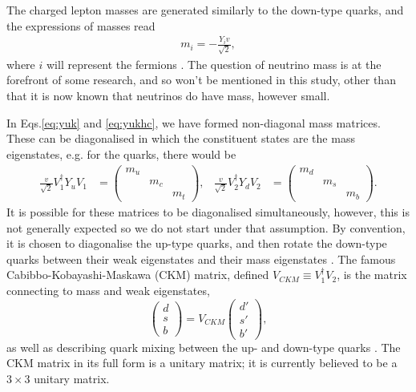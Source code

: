 \documentclass[a4paper,12pt]{article}
\begin{document}
The charged lepton masses are generated similarly to the down-type quarks, and the expressions of masses read
\begin{align}
    \label{eq:fermas}
    m_i = -\frac{Y_iv}{\sqrt{2}},
\end{align}
where $i$ will represent the fermions \cite{schwartz}. 
The question of neutrino mass is at the forefront of some research, and so won't be mentioned in this study, other than that it is now known that neutrinos do have mass, however small. 

In Eqs.\eqref{eq:yuk} and \eqref{eq:yukhc}, we have formed non-diagonal mass matrices. 
These can be diagonalised in which the constituent states are the mass eigenstates, e.g. for the quarks, there would be 
\begin{align}
    \label{eq:massmat}
    \frac{v}{\sqrt{2}}V_1^\dagger Y_uV_1 &= \begin{pmatrix} m_u & & \\ & m_c & \\ & & m_t\end{pmatrix}, & \frac{v}{\sqrt{2}}V_2^\dagger Y_dV_2 &= \begin{pmatrix} m_d & & \\ & m_s & \\ & & m_b\end{pmatrix}.
\end{align}
It is possible for these matrices to be diagonalised simultaneously, however, this is not generally expected so we do not start under that assumption. 
By convention, it is chosen to diagonalise the up-type quarks, and then rotate the down-type quarks between their weak eigenstates and their mass eigenstates \cite{dono}. 
The famous Cabibbo-Kobayashi-Maskawa (CKM) matrix, defined $V_{CKM}\equiv V_1^\dagger V_2$, is the matrix connecting to mass and weak eigenstates,
\begin{equation}
    \label{eq:ckmone}
    \begin{pmatrix} d \\ s \\ b\end{pmatrix} = V_{CKM}\begin{pmatrix} d' \\ s' \\ b'\end{pmatrix},
\end{equation}
as well as describing quark mixing between the up- and down-type quarks \cite{kobamask}. 
The CKM matrix in its full form is a unitary matrix; it is currently believed to be a $3\times3$ unitary matrix. 
\end{document}

